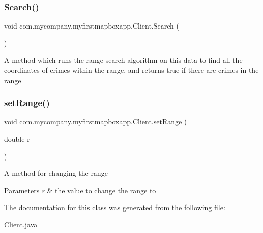 \subsubsection{\texorpdfstring{Search()}{Search()}}
{\footnotesize\ttfamily void com.\+mycompany.\+myfirstmapboxapp.\+Client.\+Search (\begin{DoxyParamCaption}{ }\end{DoxyParamCaption})\hspace{0.3cm}{\ttfamily [inline]}}

A method which runs the range search algorithm on this data to find all the coordinates of crimes within the range, and returns true if there are crimes in the range \mbox{\label{classcom_1_1mycompany_1_1myfirstmapboxapp_1_1_client_af6081be70dc01d9390ba63262e3b5bcd}} 
\subsubsection{\texorpdfstring{set\+Range()}{setRange()}}
{\footnotesize\ttfamily void com.\+mycompany.\+myfirstmapboxapp.\+Client.\+set\+Range (\begin{DoxyParamCaption}\item[{double}]{r }\end{DoxyParamCaption})\hspace{0.3cm}{\ttfamily [inline]}}

A method for changing the range 
\begin{DoxyParams}{Parameters}
{\em r} & the value to change the range to \\
\hline
\end{DoxyParams}


The documentation for this class was generated from the following file\+:\begin{DoxyCompactItemize}
\item 
Client.\+java\end{DoxyCompactItemize}
